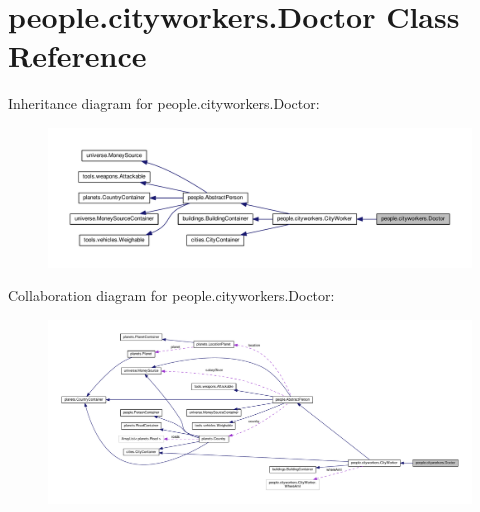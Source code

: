 \hypertarget{classpeople_1_1cityworkers_1_1_doctor}{}\section{people.\+cityworkers.\+Doctor Class Reference}
\label{classpeople_1_1cityworkers_1_1_doctor}


Inheritance diagram for people.\+cityworkers.\+Doctor\+:
\nopagebreak
\begin{figure}[H]
\begin{center}
\leavevmode
\includegraphics[width=350pt]{classpeople_1_1cityworkers_1_1_doctor__inherit__graph}
\end{center}
\end{figure}


Collaboration diagram for people.\+cityworkers.\+Doctor\+:
\nopagebreak
\begin{figure}[H]
\begin{center}
\leavevmode
\includegraphics[width=350pt]{classpeople_1_1cityworkers_1_1_doctor__coll__graph}
\end{center}
\end{figure}
